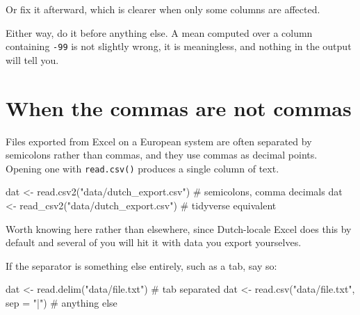 \documentclass[
  a4paper,
]{scrbook}
\newenvironment{Shaded}{\begin{snugshade}}{\end{snugshade}}
\newcommand{\AttributeTok}[1]{\textcolor[rgb]{0.40,0.45,0.13}{#1}}
\newcommand{\CommentTok}[1]{\textcolor[rgb]{0.37,0.37,0.37}{#1}}
\newcommand{\ConstantTok}[1]{\textcolor[rgb]{0.56,0.35,0.01}{#1}}
\newcommand{\DecValTok}[1]{\textcolor[rgb]{0.68,0.00,0.00}{#1}}
\newcommand{\FunctionTok}[1]{\textcolor[rgb]{0.28,0.35,0.67}{#1}}
\newcommand{\NormalTok}[1]{\textcolor[rgb]{0.00,0.23,0.31}{#1}}
\newcommand{\OtherTok}[1]{\textcolor[rgb]{0.00,0.23,0.31}{#1}}
\newcommand{\SpecialCharTok}[1]{\textcolor[rgb]{0.37,0.37,0.37}{#1}}
\newcommand{\StringTok}[1]{\textcolor[rgb]{0.13,0.47,0.30}{#1}}
\begin{document}
Or fix it afterward, which is clearer when only some columns are
affected.

\begin{Shaded}
\end{Shaded}

Either way, do it before anything else. A mean computed over a column
containing \texttt{-99} is not slightly wrong, it is meaningless, and
nothing in the output will tell you.

\section*{When the commas are not
commas}\label{when-the-commas-are-not-commas}


Files exported from Excel on a European system are often separated by
semicolons rather than commas, and they use commas as decimal points.
Opening one with \texttt{read.csv()} produces a single column of text.

\begin{Shaded}
\begin{Highlighting}[]
\NormalTok{dat }\OtherTok{\textless{}{-}} \FunctionTok{read.csv2}\NormalTok{(}\StringTok{"data/dutch\_export.csv"}\NormalTok{)   }\CommentTok{\# semicolons, comma decimals}
\NormalTok{dat }\OtherTok{\textless{}{-}} \FunctionTok{read\_csv2}\NormalTok{(}\StringTok{"data/dutch\_export.csv"}\NormalTok{)   }\CommentTok{\# tidyverse equivalent}
\end{Highlighting}
\end{Shaded}

Worth knowing here rather than elsewhere, since Dutch-locale Excel does
this by default and several of you will hit it with data you export
yourselves.

If the separator is something else entirely, such as a tab, say so:

\begin{Shaded}
\begin{Highlighting}[]
\NormalTok{dat }\OtherTok{\textless{}{-}} \FunctionTok{read.delim}\NormalTok{(}\StringTok{"data/file.txt"}\NormalTok{)                    }\CommentTok{\# tab separated}
\NormalTok{dat }\OtherTok{\textless{}{-}} \FunctionTok{read.csv}\NormalTok{(}\StringTok{"data/file.txt"}\NormalTok{, }\AttributeTok{sep =} \StringTok{"|"}\NormalTok{)           }\CommentTok{\# anything else}
\end{Highlighting}
\end{Shaded}
\end{document}
